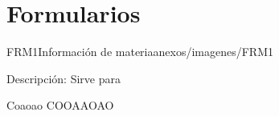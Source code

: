 \section{Formularios}

\begin{Documento}{FRM1}{Información de materia}{anexos/imagenes/FRM1}
	\item[Descripción:]Sirve para
	\begin{LCampos}
		 Coaoao
		 COOAAOAO
	\end{LCampos}
\end{Documento}